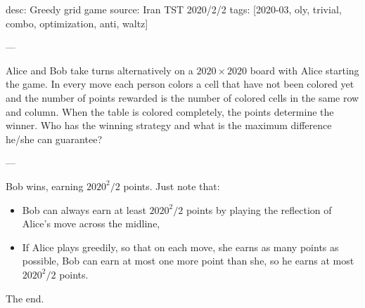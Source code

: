 desc: Greedy grid game
source: Iran TST 2020/2/2
tags: [2020-03, oly, trivial, combo, optimization, anti, waltz]

---

Alice and Bob take turns alternatively on a $2020\times2020$ board with Alice starting the game. In every move each person colors a cell that have not been colored yet and the number of points rewarded is the number of colored cells in the same row and column. When the table is colored completely, the points determine the winner. Who has the winning strategy and what is the maximum difference he/she can guarantee?

---

Bob wins, earning $2020^2/2$ points. Just note that:
\begin{itemize}
    \item Bob can always earn at least $2020^2/2$ points by playing the reflection of Alice's move across the midline,
    \item If Alice plays greedily, so that on each move, she earns as many points as possible, Bob can earn at most one more point than she, so he earns at most $2020^2/2$ points.
\end{itemize}
The end.
